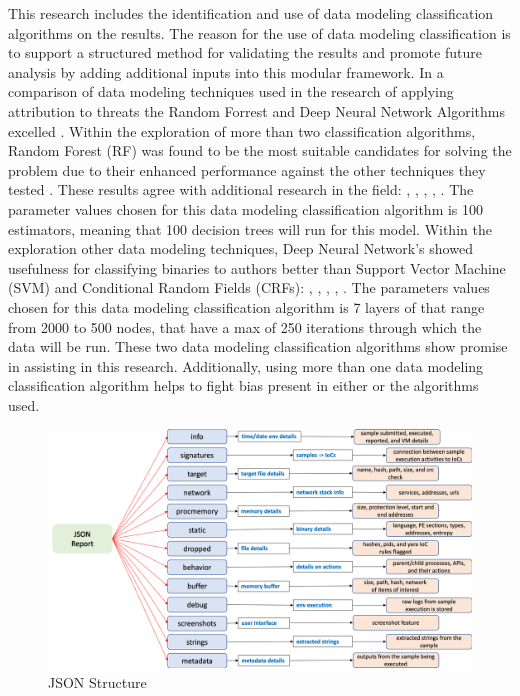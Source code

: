 \documentclass[12pt]{report}
\begin{document}
This research includes the identification and use of data modeling classification algorithms on the results.  The reason for the use of data modeling classification is to support a structured method for validating the results and promote future analysis by adding additional inputs into this modular framework.  In a comparison of data modeling techniques used in the research of applying attribution to threats the Random Forrest and Deep Neural Network Algorithms excelled \cite{gray2021identifying}.  Within the exploration of more than two classification algorithms, Random Forest (RF) was found to be the most suitable candidates for solving the problem due to their enhanced performance against the other techniques they tested  \cite{hong2018classifying}.  These results agree with additional research in the field: \cite{hendrikse2017effect}, \cite{caliskan2015coding}, \cite{kalgutkar2018android}, \cite{meng2016fine}, \cite{gonzalez2018authorship}.  The parameter values chosen for this data modeling classification algorithm is 100 estimators, meaning that 100 decision trees will run for this model.  Within the exploration other data modeling techniques, Deep Neural Network's showed usefulness for classifying binaries to authors better than Support Vector Machine (SVM) and Conditional Random Fields (CRFs): \cite{meng2018binary}, \cite{rosenberg2017deepapt}, \cite{rosenberg2018end}, \cite{alrabaee2019feasibility}, \cite{alrabaee2019bineye}.  The parameters values chosen for this data modeling classification algorithm is 7 layers of that range from 2000 to 500 nodes, that have a max of 250 iterations through which the data will be run.  These two data modeling classification algorithms show promise in assisting in this research.  Additionally, using more than one data modeling classification algorithm helps to fight bias present in either or the algorithms used.

\begin{figure}
	\centering
	\includegraphics[width=1\textwidth]{images/JSON_Structure2.png}
	\caption{JSON Structure}
	\label{fig:JSON Structure}
\end{figure}
\end{document}
